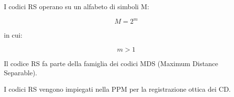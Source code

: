 I codici RS operano su un alfabeto di simboli M: 

{
    \Large 
    \begin{equation}
        M = 2^{m}
    \end{equation}
}

in cui: 

{
    \Large 
    \begin{equation}
        m > 1
    \end{equation}
}

Il codice RS fa parte della famiglia dei codici MDS (Maximum Distance Separable). \newline 

I codici RS vengono impiegati nella PPM per la registrazione ottica dei CD. \newline 

\newpage 


